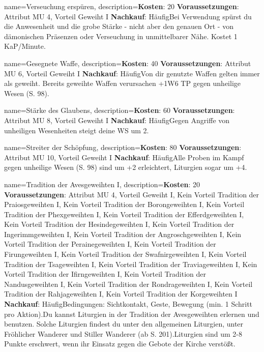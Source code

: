 {
    name={Verseuchung erspüren},
    description={\textbf{Kosten}: 20 \textbf{Voraussetzungen}: Attribut MU 4, Vorteil Geweiht I \textbf{Nachkauf}: Häufig\newline Bei Verwendung spürst du die Anwesenheit und die grobe Stärke - nicht aber den genauen Ort - von dämonischen Präsenzen oder Verseuchung in unmittelbarer Nähe. Kostet 1 KaP/Minute.}
}


{
    name={Gesegnete Waffe},
    description={\textbf{Kosten}: 40 \textbf{Voraussetzungen}: Attribut MU 6, Vorteil Geweiht I \textbf{Nachkauf}: Häufig\newline Von dir genutzte Waffen gelten immer als geweiht. Bereits geweihte Waffen verursachen +1W6 TP gegen unheilige Wesen (S. 98).}
}


{
    name={Stärke des Glaubens},
    description={\textbf{Kosten}: 60 \textbf{Voraussetzungen}: Attribut MU 8, Vorteil Geweiht I \textbf{Nachkauf}: Häufig\newline Gegen Angriffe von unheiligen Wesenheiten steigt deine WS um 2.}
}


{
    name={Streiter der Schöpfung},
    description={\textbf{Kosten}: 80 \textbf{Voraussetzungen}: Attribut MU 10, Vorteil Geweiht I \textbf{Nachkauf}: Häufig\newline Alle Proben im Kampf gegen unheilige Wesen (S. 98) sind um +2 erleichtert, Liturgien sogar um +4.}
}


{
    name={Tradition der Avesgeweihten I},
    description={\textbf{Kosten}: 20 \textbf{Voraussetzungen}: Attribut MU 4, Vorteil Geweiht I, Kein Vorteil Tradition der Praiosgeweihten I, Kein Vorteil Tradition der Borongeweihten I, Kein Vorteil Tradition der Phexgeweihten I, Kein Vorteil Tradition der Efferdgeweihten I, Kein Vorteil Tradition der Hesindegeweihten I, Kein Vorteil Tradition der Ingerimmgeweihten I, Kein Vorteil Tradition der Angroschgeweihten I, Kein Vorteil Tradition der Perainegeweihten I, Kein Vorteil Tradition der Firungeweihten I, Kein Vorteil Tradition der Swafnirgeweihten I, Kein Vorteil Tradition der Tsageweihten I, Kein Vorteil Tradition der Traviageweihten I, Kein Vorteil Tradition der Ifirngeweihten I, Kein Vorteil Tradition der Nandusgeweihten I, Kein Vorteil Tradition der Rondrageweihten I, Kein Vorteil Tradition der Rahjageweihten I, Kein Vorteil Tradition der Korgeweihten I \textbf{Nachkauf}: Häufig\newline Bedingungen: Sichtkontakt, Geste, Bewegung (min. 1 Schritt pro Aktion).\newline Du kannst Liturgien in der Tradition der Avesgeweihten erlernen und benutzen. Solche Liturgien findest du unter den allgemeinen Liturgien, unter Fröhlicher Wanderer und Stiller Wanderer (ab S. 201).\newline Liturgien sind um 2-8 Punkte erschwert, wenn ihr Einsatz gegen die Gebote der Kirche verstößt.}
}



